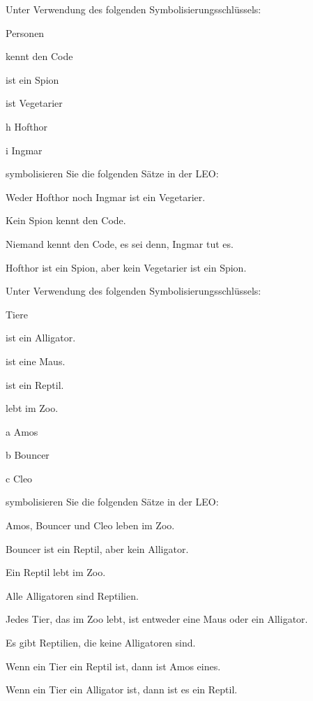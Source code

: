 \problempart
\label{pr.FOLvegetarians}
Unter Verwendung des folgenden Symbolisierungsschlüssels:
\begin{ekey}
\item[\text{Domäne}] Personen
\item[\atom{K}{x}]  kennt den Code
\item[\atom{S}{x}]  ist ein Spion
\item[\atom{V}{x}]  ist Vegetarier
\item[h] Hofthor
\item[i] Ingmar
\end{ekey}
symbolisieren Sie die folgenden Sätze in der LEO:
\begin{earg}
\item Weder Hofthor noch Ingmar ist ein Vegetarier.
\item Kein Spion kennt den Code.
\item Niemand kennt den Code, es sei denn, Ingmar tut es.
\item Hofthor ist ein Spion, aber kein Vegetarier ist ein Spion.
\end{earg}
\solutions
\problempart\label{pr.FOLalligators}
Unter Verwendung des folgenden Symbolisierungsschlüssels:
\begin{ekey}
\item[\text{Domäne}] Tiere
\item[\atom{A}{x}]  ist ein Alligator.
\item[\atom{M}{x}]  ist eine Maus.
\item[\atom{R}{x}]  ist ein Reptil.
\item[\atom{Z}{x}]  lebt im Zoo.
\item[a] Amos
\item[b] Bouncer
\item[c] Cleo
\end{ekey}
symbolisieren Sie die folgenden Sätze in der LEO:
\begin{earg}
\item Amos, Bouncer und Cleo leben im Zoo. 
\item Bouncer ist ein Reptil, aber kein Alligator. 
\item Ein Reptil lebt im Zoo. 
\item Alle Alligatoren sind Reptilien.
\item Jedes Tier, das im Zoo lebt, ist entweder eine Maus oder ein Alligator. 
\item Es gibt Reptilien, die keine Alligatoren sind.
\item Wenn ein Tier ein Reptil ist, dann ist Amos eines.
\item Wenn ein Tier ein Alligator ist, dann ist es ein Reptil.
\end{earg}

